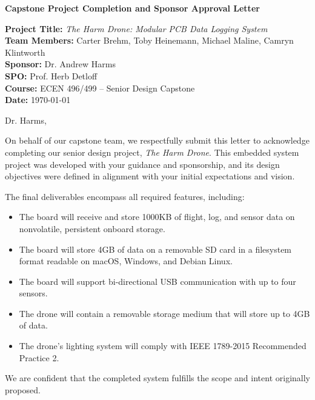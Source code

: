 \documentclass[11pt]{letter}
\begin{document}
\begin{center}
    \large \textbf{Capstone Project Completion and Sponsor Approval Letter}
\end{center}

\vspace{1em}

\noindent\textbf{Project Title:} \textit{The Harm Drone: Modular PCB Data Logging System} \\
\textbf{Team Members:} Carter Brehm, Toby Heinemann, Michael Maline, Camryn Klintworth \\
\textbf{Sponsor:} Dr. Andrew Harms \\
\textbf{SPO:} Prof. Herb Detloff \\
\textbf{Course:} ECEN 496/499 – Senior Design Capstone \\
\textbf{Date:} \today

\vspace{1.5em}

\noindent Dr. Harms,

\vspace{1em}

On behalf of our capstone team, we respectfully submit this letter to acknowledge completing our senior design project, \textit{The Harm Drone}. This embedded system project was developed with your guidance and sponsorship, and its design objectives were defined in alignment with your initial expectations and vision.

The final deliverables encompass all required features, including:
\begin{itemize}
   \item The board will receive and store 1000KB of flight, log, and sensor data on nonvolatile, persistent onboard storage. 
    \item The board will store 4GB of data on a removable SD card in a filesystem format readable on macOS, Windows, and Debian Linux. 
    \item The board will support bi-directional USB communication with up to four sensors.
    \item The drone will contain a removable storage medium that will store up to 4GB of data.
    \item The drone’s lighting system will comply with IEEE 1789-2015 Recommended Practice 2.
\end{itemize}

We are confident that the completed system fulfills the scope and intent originally proposed.
\end{document}
